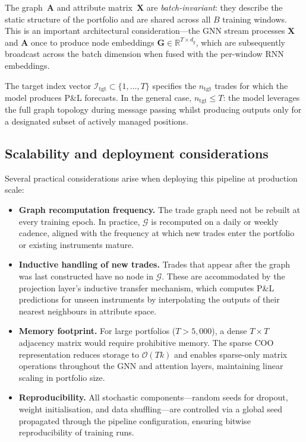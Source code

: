 \documentclass[11pt,a4paper]{article}
\newcommand{\R}{\mathbb{R}}
\newcommand{\calG}{\mathcal{G}}
\newcommand{\calI}{\mathcal{I}}
\newcommand{\bA}{\bm{A}}
\newcommand{\bX}{\bm{X}}
\begin{document}
The graph~$\bA$ and attribute matrix~$\bX$ are \emph{batch-invariant}: they
describe the static structure of the portfolio and are shared across all $B$
training windows.  This is an important architectural consideration---the GNN
stream processes $\bX$ and $\bA$ once to produce node embeddings
$\bm{G} \in \R^{T \times d_g}$, which are subsequently broadcast across the
batch dimension when fused with the per-window RNN embeddings.

The target index vector
$\calI_{\mathrm{tgt}} \subset \{1,\dotsc,T\}$ specifies the
$n_{\mathrm{tgt}}$ trades for which the model produces P\&L forecasts.  In
the general case, $n_{\mathrm{tgt}} \leq T$: the model leverages the full
graph topology during message passing whilst producing outputs only for a
designated subset of actively managed positions.


\subsection{Scalability and deployment considerations}%
\label{sec:assembly:scalability}

Several practical considerations arise when deploying this pipeline at
production scale:
%
\begin{itemize}[nosep]
  \item \textbf{Graph recomputation frequency.}
    The trade graph need not be rebuilt at every training epoch.  In practice,
    $\calG$ is recomputed on a daily or weekly cadence, aligned with the
    frequency at which new trades enter the portfolio or existing instruments
    mature.

  \item \textbf{Inductive handling of new trades.}
    Trades that appear after the graph was last constructed have no node in
    $\calG$.  These are accommodated by the projection layer's inductive
    transfer mechanism, which computes P\&L predictions for unseen instruments
    by interpolating the outputs of their nearest neighbours in attribute
    space.

  \item \textbf{Memory footprint.}
    For large portfolios ($T > 5{,}000$), a dense $T \times T$ adjacency
    matrix would require prohibitive memory.  The sparse COO representation
    reduces storage to $\mathcal{O}(Tk)$ and enables sparse-only matrix
    operations throughout the GNN and attention layers, maintaining linear
    scaling in portfolio size.

  \item \textbf{Reproducibility.}
    All stochastic components---random seeds for dropout, weight
    initialisation, and data shuffling---are controlled via a global seed
    propagated through the pipeline configuration, ensuring bitwise
    reproducibility of training runs.
\end{itemize}
\end{document}
